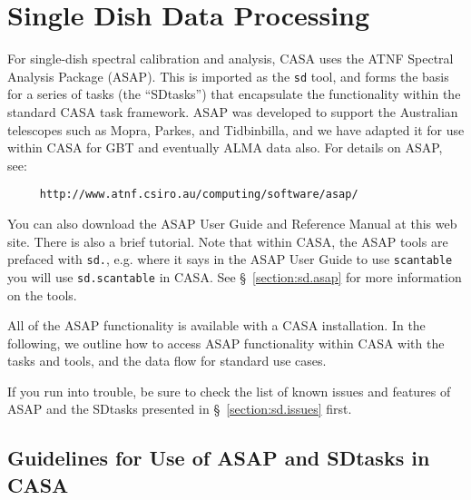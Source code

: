 \chapter{Single Dish Data Processing}
\label{chapter:SD}


For single-dish spectral calibration and analysis, 
CASA uses the ATNF Spectral Analysis Package (ASAP).  This is
imported as the {\tt sd} tool, and forms the basis for a series
of tasks (the ``SDtasks'') that encapsulate the functionality
within the standard CASA task framework.  ASAP was developed to
support the Australian telescopes such as Mopra, Parkes, and
Tidbinbilla, and we have adapted it for use within CASA for
GBT and eventually ALMA data also.  For details on ASAP, see: 
\small
\begin{verbatim}
     http://www.atnf.csiro.au/computing/software/asap/
\end{verbatim}
\normalsize
You can also download the ASAP User Guide and Reference Manual at this
web site.  There is also a brief tutorial.  Note that within CASA,
the ASAP tools are prefaced with {\tt sd.}, e.g. where it
says in the ASAP User Guide to use {\tt scantable} you will use
{\tt sd.scantable} in CASA.  See \S~\ref{section:sd.asap} for more
information on the tools.

All of the ASAP functionality is available with a CASA
installation.  In the following, we outline how to access ASAP
functionality within CASA with the tasks and tools,
and the data flow for standard use cases.

If you run into trouble, be sure to check the list of known issues
and features of ASAP and the SDtasks presented in 
\S~\ref{section:sd.issues} first.

\section{Guidelines for Use of ASAP and SDtasks in CASA}
\label{section:sd.intro}

